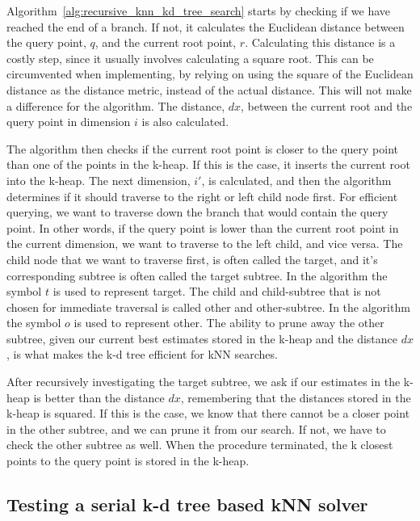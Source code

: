 Algorithm~\ref{alg:recursive_knn_kd_tree_search} starts by checking if we have reached the end of a branch. If not, it calculates the Euclidean distance between the query point, $q$, and the current root point, $r$. Calculating this distance is a costly step, since it usually involves calculating a square root. This can be circumvented when implementing, by relying on using the square of the Euclidean distance as the distance metric, instead of the actual distance. This will not make a difference for the algorithm. The distance, $dx$, between the current root and the query point in dimension $i$ is also calculated.

The algorithm then checks if the current root point is closer to the query point than one of the points in the k-heap. If this is the case, it inserts the current root into the k-heap. The next dimension, $i'$, is calculated, and then the algorithm determines if it should traverse to the right or left child node first. For efficient querying, we want to traverse down the branch that would contain the query point. In other words, if the query point is lower than the current root point in the current dimension, we want to traverse to the left child, and vice versa. The child node that we want to traverse first, is often called the target, and it's corresponding subtree is often called the target subtree. In the algorithm the symbol $t$ is used to represent target. The child and child-subtree that is not chosen for immediate traversal is called other and other-subtree. In the algorithm the symbol $o$ is used to represent other. The ability to prune away the other subtree, given our current best estimates stored in the k-heap and the distance $dx$, is what makes the k-d tree efficient for kNN searches.

After recursively investigating the target subtree, we ask if our estimates in the k-heap is better than the distance $dx$, remembering that the distances stored in the k-heap is squared. If this is the case, we know that there cannot be a closer point in the other subtree, and we can prune it from our search. If not, we have to check the other subtree as well. When the procedure terminated, the k closest points to the query point is stored in the k-heap.

\subsection{Testing a serial k-d tree based kNN solver} %
\label{sub:testing_a_serial_k_d_tree_based_knn_solver}

